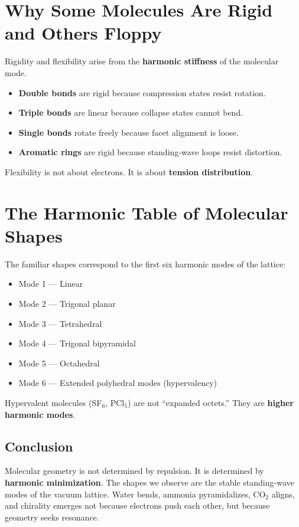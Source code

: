 \documentclass[11pt, letterpaper, openany]{book}
\begin{document}
\section{Why Some Molecules Are Rigid and Others Floppy}

Rigidity and flexibility arise from the \textbf{harmonic stiffness} of the molecular mode.

\begin{itemize}
    \item \textbf{Double bonds} are rigid because compression states resist rotation.
    \item \textbf{Triple bonds} are linear because collapse states cannot bend.
    \item \textbf{Single bonds} rotate freely because facet alignment is loose.
    \item \textbf{Aromatic rings} are rigid because standing‑wave loops resist distortion.
\end{itemize}

Flexibility is not about electrons. It is about \textbf{tension distribution}.

\section{The Harmonic Table of Molecular Shapes}

The familiar shapes correspond to the first six harmonic modes of the lattice:

\begin{itemize}
    \item Mode 1 — Linear
    \item Mode 2 — Trigonal planar
    \item Mode 3 — Tetrahedral
    \item Mode 4 — Trigonal bipyramidal
    \item Mode 5 — Octahedral
    \item Mode 6 — Extended polyhedral modes (hypervalency)
\end{itemize}

Hypervalent molecules (SF$_6$, PCl$_5$) are not “expanded octets.”  
They are \textbf{higher harmonic modes}.

\subsection*{Conclusion}

Molecular geometry is not determined by repulsion. It is determined by \textbf{harmonic
minimization}. The shapes we observe are the stable standing‑wave modes of the vacuum
lattice. Water bends, ammonia pyramidalizes, CO$_2$ aligns, and chirality emerges not
because electrons push each other, but because geometry seeks resonance.
\end{document}
